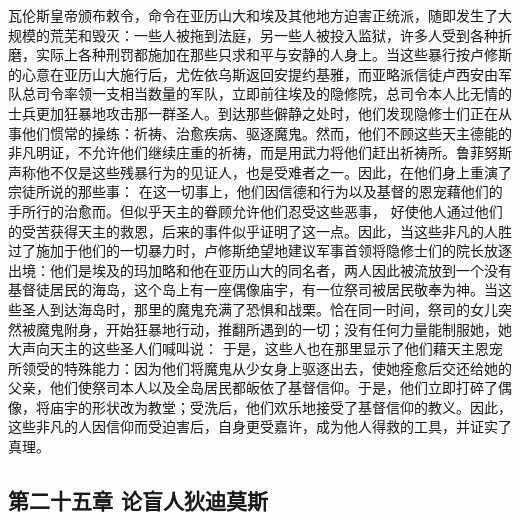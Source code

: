 瓦伦斯皇帝颁布敕令，命令在亚历山大和埃及其他地方迫害正统派，随即发生了大规模的荒芜和毁灭：一些人被拖到法庭，另一些人被投入监狱，许多人受到各种折磨，实际上各种刑罚都施加在那些只求和平与安静的人身上。当这些暴行按卢修斯的心意在亚历山大施行后，尤佐依乌斯返回安提约基雅，而亚略派信徒卢西安由军队总司令率领一支相当数量的军队，立即前往埃及的隐修院，总司令本人比无情的士兵更加狂暴地攻击那一群圣人。到达那些僻静之处时，他们发现隐修士们正在从事他们惯常的操练：祈祷、治愈疾病、驱逐魔鬼。然而，他们不顾这些天主德能的非凡明证，不允许他们继续庄重的祈祷，而是用武力将他们赶出祈祷所。鲁菲努斯声称他不仅是这些残暴行为的见证人，也是受难者之一。因此，在他们身上重演了宗徒所说的那些事： 在这一切事上，他们因信德和行为以及基督的恩宠藉他们的手所行的治愈而。但似乎天主的眷顾允许他们忍受这些恶事，  好使他人通过他们的受苦获得天主的救恩，后来的事件似乎证明了这一点。因此，当这些非凡的人胜过了施加于他们的一切暴力时，卢修斯绝望地建议军事首领将隐修士们的院长放逐出境：他们是埃及的玛加略和他在亚历山大的同名者，两人因此被流放到一个没有基督徒居民的海岛，这个岛上有一座偶像庙宇，有一位祭司被居民敬奉为神。当这些圣人到达海岛时，那里的魔鬼充满了恐惧和战栗。恰在同一时间，祭司的女儿突然被魔鬼附身，开始狂暴地行动，推翻所遇到的一切；没有任何力量能制服她，她大声向天主的这些圣人们喊叫说：  于是，这些人也在那里显示了他们藉天主恩宠所领受的特殊能力：因为他们将魔鬼从少女身上驱逐出去，使她痊愈后交还给她的父亲，他们使祭司本人以及全岛居民都皈依了基督信仰。于是，他们立即打碎了偶像，将庙宇的形状改为教堂；受洗后，他们欢乐地接受了基督信仰的教义。因此，这些非凡的人因信仰而受迫害后，自身更受嘉许，成为他人得救的工具，并证实了真理。\par


\subsection{第二十五章 论盲人狄迪莫斯}

